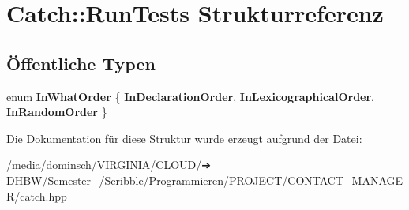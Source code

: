 \hypertarget{structCatch_1_1RunTests}{}\section{Catch\+:\+:Run\+Tests Strukturreferenz}
\label{structCatch_1_1RunTests}
\subsection*{Öffentliche Typen}
\begin{DoxyCompactItemize}
\item 
\mbox{\label{structCatch_1_1RunTests_ab56bd851b1dd085869992d1a9d73dc5d}} 
enum {\bfseries In\+What\+Order} \{ {\bfseries In\+Declaration\+Order}, 
{\bfseries In\+Lexicographical\+Order}, 
{\bfseries In\+Random\+Order}
 \}
\end{DoxyCompactItemize}


Die Dokumentation für diese Struktur wurde erzeugt aufgrund der Datei\+:\begin{DoxyCompactItemize}
\item 
/media/dominsch/\+V\+I\+R\+G\+I\+N\+I\+A/\+C\+L\+O\+U\+D/➔ D\+H\+B\+W/\+Semester\+\_/\+Scribble/\+Programmieren/\+P\+R\+O\+J\+E\+C\+T/\+C\+O\+N\+T\+A\+C\+T\+\_\+\+M\+A\+N\+A\+G\+E\+R/catch.\+hpp\end{DoxyCompactItemize}
